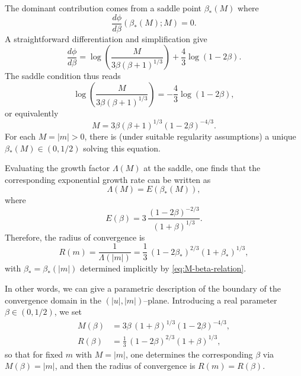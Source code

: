 \documentclass[11pt, a4paper]{article}
\numberwithin{equation}{section}
\begin{document}
The dominant contribution comes from a saddle point $\beta_*(M)$ where
\begin{equation}
  \frac{d\phi}{d\beta}(\beta_*(M);M) = 0.
\end{equation}
A straightforward differentiation and simplification give
\begin{equation}
  \frac{d\phi}{d\beta}
  =
  \log\!\left(\frac{M}{3\beta(\beta+1)^{1/3}}\right)
  + \frac{4}{3}\log(1-2\beta).
\end{equation}
The saddle condition thus reads
\begin{equation}
  \log\!\left(\frac{M}{3\beta(\beta+1)^{1/3}}\right)
  = -\frac{4}{3}\log(1-2\beta),
\end{equation}
or equivalently
\begin{equation}
  M
  = 3\beta(\beta+1)^{1/3}(1-2\beta)^{-4/3}.
  \label{eq:M-beta-relation}
\end{equation}
For each $M = |m|>0$, there is (under suitable regularity assumptions) a unique
$\beta_*(M)\in(0,1/2)$ solving this equation.

Evaluating the growth factor $\Lambda(M)$ at the saddle, one finds that the
corresponding exponential growth rate can be written as
\begin{equation}
  \Lambda(M) = E(\beta_*(M)),
\end{equation}
where
\begin{equation}
  E(\beta) = 3\,\frac{(1-2\beta)^{-2/3}}{(1+\beta)^{1/3}}.
\end{equation}
Therefore, the radius of convergence is
\begin{equation}
  R(m)
  = \frac{1}{\Lambda(|m|)}
  = \frac{1}{3}\,(1-2\beta_*)^{2/3}(1+\beta_*)^{1/3},
\end{equation}
with $\beta_* = \beta_*(|m|)$ determined implicitly by
\eqref{eq:M-beta-relation}.

In other words, we can give a parametric description of the boundary of the
convergence domain in the $(|u|,|m|)$--plane. Introducing a real parameter
$\beta \in (0,1/2)$, we set
\begin{equation}
  \boxed{
  \begin{aligned}
    M(\beta) &= 3\beta\,(1+\beta)^{1/3}(1-2\beta)^{-4/3},\\[3pt]
    R(\beta) &= \frac{1}{3}\,(1-2\beta)^{2/3}(1+\beta)^{1/3},
  \end{aligned}
  }
\end{equation}
so that for fixed $m$ with $M=|m|$, one determines the corresponding $\beta$ via
$M(\beta)=|m|$, and then the radius of convergence is $R(m)=R(\beta)$.
\end{document}
